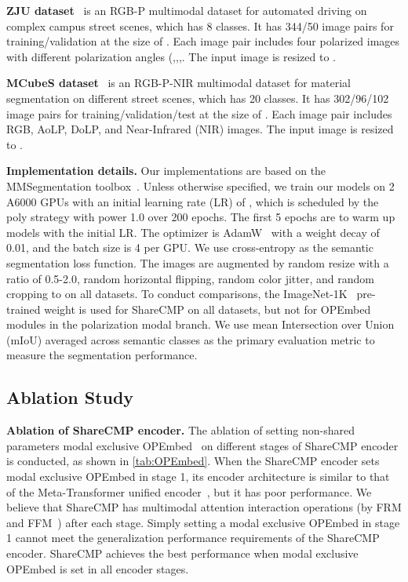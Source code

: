 \documentclass[10pt,twocolumn,letterpaper]{article}
\begin{document}
\medskip
\noindent
\textbf{ZJU dataset}~\cite{zju} is an RGB-P multimodal dataset for automated driving on complex campus street scenes, which has 8 classes. It has 344/50 image pairs for training/validation at the size of . Each image pair includes four polarized images with different polarization angles (,,,. The input image is resized to .


\medskip
\noindent
\textbf{MCubeS dataset}~\cite{mcubes} is an RGB-P-NIR multimodal dataset for material segmentation on different street scenes, which has 20 classes. It has 302/96/102 image pairs for training/validation/test at the size of . Each image pair includes RGB, AoLP, DoLP, and Near-Infrared (NIR) images. The input image is resized to .


\medskip
\noindent
\textbf{Implementation details.}
Our implementations are based on the MMSegmentation toolbox~\cite{mmseg}. Unless otherwise specified, we train our models on 2 A6000 GPUs with an initial learning rate (LR) of , which is scheduled by the poly strategy with power 1.0 over 200 epochs. The first 5 epochs are to warm up models with  the initial LR. The optimizer is AdamW~\cite{49} with a weight decay of 0.01, and the batch size is 4 per GPU. We use cross-entropy as the semantic segmentation loss function. The images are augmented by random resize with a ratio of 0.5-2.0, random horizontal flipping, random color jitter, and random cropping to  on all datasets. To conduct comparisons, the ImageNet-1K~\cite{50} pre-trained weight is used for ShareCMP on all datasets, but not for OPEmbed~\cite{26} modules in the polarization modal branch. We use mean Intersection over Union (mIoU) averaged across semantic classes as the primary evaluation metric to measure the segmentation performance.


\subsection{Ablation Study}
\label{sec:ablation_study}


\medskip
\noindent
\textbf{Ablation of ShareCMP encoder.}
The ablation of setting non-shared parameters modal exclusive OPEmbed~\cite{26} on different stages of ShareCMP encoder is conducted, as shown in \cref{tab:OPEmbed}. When the ShareCMP encoder sets modal exclusive OPEmbed in stage 1, its encoder architecture is similar to that of the Meta-Transformer unified encoder~\cite{metatransformer}, but it has poor performance. We believe that ShareCMP has multimodal attention interaction operations (by FRM and FFM~\cite{cmx}) after each stage. Simply setting a modal exclusive OPEmbed in stage 1 cannot meet the generalization performance requirements of the ShareCMP encoder. ShareCMP achieves the best performance when modal exclusive OPEmbed is set in all encoder stages.
\end{document}
